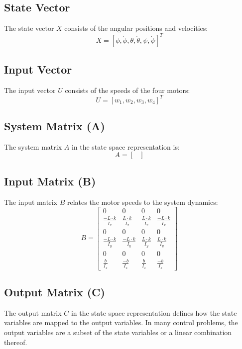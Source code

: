 \documentclass[12pt]{article}
\begin{document}
\subsection{State Vector}
The state vector $X$ consists of the angular positions and velocities:
\begin{equation*}
    X = [\phi, \dot{\phi}, \theta, \dot{\theta}, \psi, \dot{\psi}]^T
\end{equation*}

\subsection{Input Vector}
The input vector $U$ consists of the speeds of the four motors:
\begin{equation*}
    U = [w_1, w_2, w_3, w_4]^T
\end{equation*}

\subsection{System Matrix (A)}
The system matrix $A$ in the state space representation is:
\begin{equation*}
    A = \begin{bmatrix}
     
    \end{bmatrix}
\end{equation*}

\subsection{Input Matrix (B)}
The input matrix $B$ relates the motor speeds to the system dynamics:
\begin{equation*}
    B = \begin{bmatrix}
    0 & 0 & 0 & 0 \\
    \frac{-L \cdot k}{I_x} & \frac{L \cdot k}{I_x} & \frac{L \cdot k}{I_x} & \frac{-L \cdot k}{I_x} \\
    0 & 0 & 0 & 0 \\
    \frac{-L \cdot k}{I_y} & \frac{-L \cdot k}{I_y} & \frac{L \cdot k}{I_y} & \frac{L \cdot k}{I_y} \\
    0 & 0 & 0 & 0 \\
    \frac{b}{I_z} & \frac{-b}{I_z} & \frac{b}{I_z} & \frac{-b}{I_z}
    \end{bmatrix}
\end{equation*}

\subsection{Output Matrix (C)}
The output matrix \( C \) in the state space representation defines how the state variables are mapped to the output variables. In many control problems, the output variables are a subset of the state variables or a linear combination thereof.\newline
\end{document}
